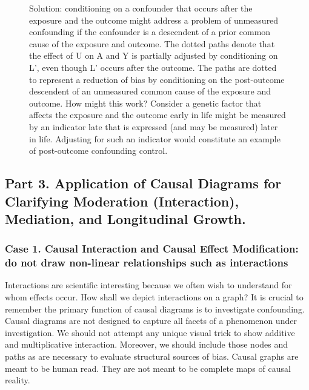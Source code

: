 \documentclass[
  singlecolumn,
  9pt]{article}
\begin{document}
\begin{figure}


\caption{\label{fig-dag-descendent-solution-2}Solution: conditioning on
a confounder that occurs after the exposure and the outcome might
address a problem of unmeasured confounding if the confounder is a
descendent of a prior common cause of the exposure and outcome. The
dotted paths denote that the effect of U on A and Y is partially
adjusted by conditioning on L', even though L' occurs after the outcome.
The paths are dotted to represent a reduction of bias by conditioning on
the post-outcome descendent of an unmeasured common cause of the
exposure and outcome. How might this work? Consider a genetic factor
that affects the exposure and the outcome early in life might be
measured by an indicator late that is expressed (and may be measured)
later in life. Adjusting for such an indicator would constitute an
example of post-outcome confounding control.}

\end{figure}%

\subsection{Part 3. Application of Causal Diagrams for Clarifying
Moderation (Interaction), Mediation, and Longitudinal
Growth.}\label{part-3.-application-of-causal-diagrams-for-clarifying-moderation-interaction-mediation-and-longitudinal-growth.}

\subsubsection{Case 1. Causal Interaction and Causal Effect
Modification: do not draw non-linear relationships such as
interactions}\label{case-1.-causal-interaction-and-causal-effect-modification-do-not-draw-non-linear-relationships-such-as-interactions}

Interactions are scientific interesting because we often wish to
understand for whom effects occur. How shall we depict interactions on a
graph? It is crucial to remember the primary function of causal diagrams
is to investigate confounding. Causal diagrams are not designed to
capture all facets of a phenomenon under investigation. We should not
attempt any unique visual trick to show additive and multiplicative
interaction. Moreover, we should include those nodes and paths as are
necessary to evaluate structural sources of bias. Causal graphs are
meant to be human read. They are not meant to be complete maps of causal
reality.
\end{document}
